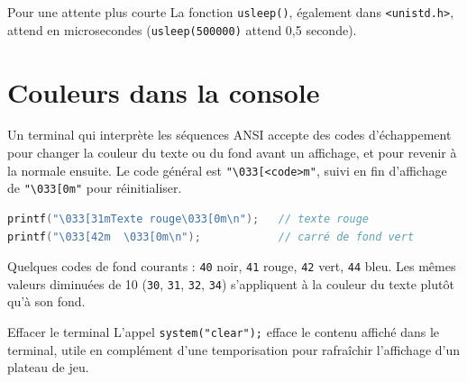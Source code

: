 \begin{UPSTIinfor}{Pour une attente plus courte}
La fonction \texttt{usleep()}, également dans \texttt{<unistd.h>}, attend
en microsecondes (\texttt{usleep(500000)} attend 0,5 seconde).
\end{UPSTIinfor}

\section{Couleurs dans la console}

Un terminal qui interprète les séquences ANSI accepte des codes
d'échappement pour changer la couleur du texte ou du fond avant un
affichage, et pour revenir à la normale ensuite. Le code général est
\texttt{"\textbackslash033[<code>m"}, suivi en fin d'affichage de
\texttt{"\textbackslash033[0m"} pour réinitialiser.

\begin{lstlisting}[language=C]
printf("\033[31mTexte rouge\033[0m\n");   // texte rouge
printf("\033[42m  \033[0m\n");            // carré de fond vert
\end{lstlisting}

Quelques codes de fond courants : \texttt{40} noir, \texttt{41} rouge,
\texttt{42} vert, \texttt{44} bleu. Les mêmes valeurs diminuées de 10
(\texttt{30}, \texttt{31}, \texttt{32}, \texttt{34}) s'appliquent à la
couleur du texte plutôt qu'à son fond.

\begin{UPSTIinfor}{Effacer le terminal}
L'appel \texttt{system("clear");} efface le contenu affiché dans le
terminal, utile en complément d'une temporisation pour rafraîchir
l'affichage d'un plateau de jeu.
\end{UPSTIinfor}
